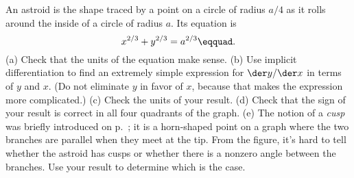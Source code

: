 An astroid is the shape traced by a point on a circle of radius $a/4$ as it rolls
around the inside of a circle of radius $a$. Its equation is
\begin{equation*}
  x^{2/3}+y^{2/3} = a^{2/3}\eqquad.
\end{equation*}
(a) Check that the units of the equation make sense.
(b) Use implicit differentiation to find
an extremely simple expression for $\der y/\der x$ in terms of $y$ and $x$.
(Do not eliminate $y$ in favor of $x$, because that makes the expression more complicated.)
(c) Check the units of your result.
(d) Check that the sign of your result is correct in all four quadrants of the graph.
(e) The notion of a \emph{cusp} was briefly introduced on p.~\pageref{fig:caustic};
it is a horn-shaped point on a graph where the two branches are parallel when they
meet at the tip. From the figure, it's hard to tell whether the astroid has cusps
or whether there is a nonzero angle between the branches. Use your result to determine
which is the case.
